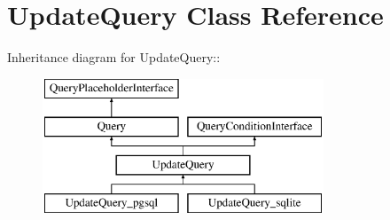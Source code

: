 \hypertarget{classUpdateQuery}{
\section{UpdateQuery Class Reference}
\label{classUpdateQuery}
}
Inheritance diagram for UpdateQuery::\begin{figure}[H]
\begin{center}
\leavevmode
\includegraphics[height=4cm]{classUpdateQuery}
\end{center}
\end{figure}
